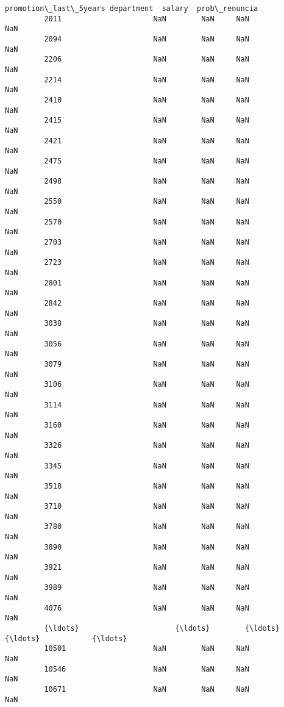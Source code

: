 \documentclass[11pt]{article}
\begin{document}
\begin{Verbatim}[commandchars=\\\{\}]
                promotion\_last\_5years department  salary  prob\_renuncia  
         2011                     NaN        NaN     NaN            NaN  
         2094                     NaN        NaN     NaN            NaN  
         2206                     NaN        NaN     NaN            NaN  
         2214                     NaN        NaN     NaN            NaN  
         2410                     NaN        NaN     NaN            NaN  
         2415                     NaN        NaN     NaN            NaN  
         2421                     NaN        NaN     NaN            NaN  
         2475                     NaN        NaN     NaN            NaN  
         2498                     NaN        NaN     NaN            NaN  
         2550                     NaN        NaN     NaN            NaN  
         2570                     NaN        NaN     NaN            NaN  
         2703                     NaN        NaN     NaN            NaN  
         2723                     NaN        NaN     NaN            NaN  
         2801                     NaN        NaN     NaN            NaN  
         2842                     NaN        NaN     NaN            NaN  
         3038                     NaN        NaN     NaN            NaN  
         3056                     NaN        NaN     NaN            NaN  
         3079                     NaN        NaN     NaN            NaN  
         3106                     NaN        NaN     NaN            NaN  
         3114                     NaN        NaN     NaN            NaN  
         3160                     NaN        NaN     NaN            NaN  
         3326                     NaN        NaN     NaN            NaN  
         3345                     NaN        NaN     NaN            NaN  
         3518                     NaN        NaN     NaN            NaN  
         3710                     NaN        NaN     NaN            NaN  
         3780                     NaN        NaN     NaN            NaN  
         3890                     NaN        NaN     NaN            NaN  
         3921                     NaN        NaN     NaN            NaN  
         3989                     NaN        NaN     NaN            NaN  
         4076                     NaN        NaN     NaN            NaN  
         {\ldots}                      {\ldots}        {\ldots}     {\ldots}            {\ldots}  
         10501                    NaN        NaN     NaN            NaN  
         10546                    NaN        NaN     NaN            NaN  
         10671                    NaN        NaN     NaN            NaN  

\end{Verbatim}
\end{document}
